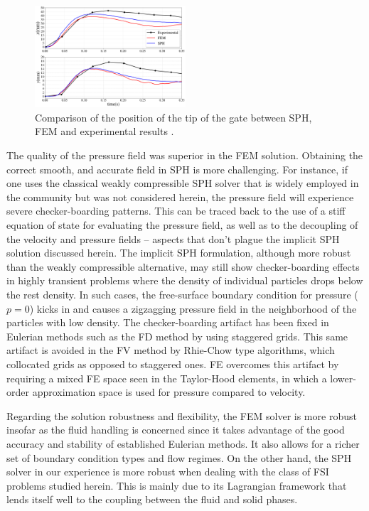\begin{figure}[H]
	\vspace{-15pt}
	\begin{center}
		\includegraphics[width=0.5\textwidth]{images/FSI_Comparison/Fig_FSI.png}
	\end{center}
	\caption{Comparison of the position of the tip of the gate between SPH, FEM and experimental results \cite{Antoci2007}.}
	\label{fig:EG_data}
\end{figure}

The quality of the pressure field was superior in the FEM solution. Obtaining the correct smooth, and accurate field in SPH is more challenging. For instance, if one uses the classical weakly compressible SPH solver that is widely employed in the community but was not considered herein, the pressure field will experience severe checker-boarding patterns. This can be traced back to the use of a stiff equation of state for evaluating the pressure field, as well as to the decoupling of the velocity and pressure fields -- aspects that don't plague the implicit SPH solution discussed herein. 
The implicit SPH formulation, although more robust than the weakly compressible alternative, may still show checker-boarding effects in highly transient problems where the density of individual particles drops below the rest density. In such cases, the free-surface boundary condition for pressure ($p=0$) kicks in and causes a zigzagging pressure field in the neighborhood of the particles with low density. The checker-boarding artifact has been fixed in Eulerian methods such as the FD method by using staggered grids. This same artifact is avoided in the FV method by Rhie-Chow type algorithms, which collocated grids as opposed to staggered ones. FE overcomes this artifact by requiring a mixed FE space seen in the Taylor-Hood elements, in which a lower-order approximation space is used for pressure compared to velocity.  

Regarding the solution robustness and flexibility, the FEM solver is more robust insofar as the fluid handling is concerned since it takes advantage of the good accuracy and stability of established Eulerian methods. It also allows for a richer set of boundary condition types and flow regimes. On the other hand, the SPH solver in our experience is more robust when dealing with the class of FSI problems studied herein. This is mainly due to its Lagrangian framework that lends itself well to the coupling between the fluid and solid phases. 

